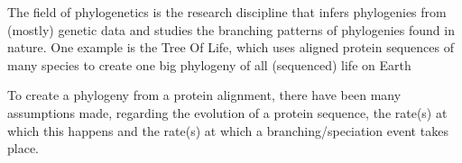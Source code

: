 The field of phylogenetics is the research discipline that
infers phylogenies from (mostly) genetic data and studies the 
branching patterns of phylogenies found in nature.
One example is the Tree Of Life, which uses aligned protein sequences
of many species to create one big phylogeny of all (sequenced) life on Earth

%
%

To create a phylogeny from a protein alignment, there have been many assumptions 
made, regarding the evolution of a protein sequence, 
the rate(s) at which this happens and the rate(s) at which 
a branching/speciation event takes place. 







